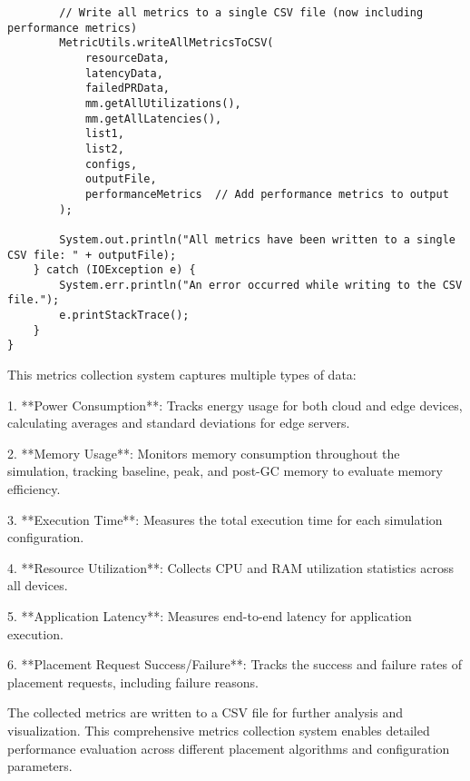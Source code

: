 \begin{verbatim}
        // Write all metrics to a single CSV file (now including performance metrics)
        MetricUtils.writeAllMetricsToCSV(
            resourceData, 
            latencyData, 
            failedPRData, 
            mm.getAllUtilizations(), 
            mm.getAllLatencies(), 
            list1, 
            list2, 
            configs, 
            outputFile,
            performanceMetrics  // Add performance metrics to output
        );
        
        System.out.println("All metrics have been written to a single CSV file: " + outputFile);
    } catch (IOException e) {
        System.err.println("An error occurred while writing to the CSV file.");
        e.printStackTrace();
    }
}
\end{verbatim}

This metrics collection system captures multiple types of data:

1. **Power Consumption**: Tracks energy usage for both cloud and edge devices, calculating averages and standard deviations for edge servers.

2. **Memory Usage**: Monitors memory consumption throughout the simulation, tracking baseline, peak, and post-GC memory to evaluate memory efficiency.

3. **Execution Time**: Measures the total execution time for each simulation configuration.

4. **Resource Utilization**: Collects CPU and RAM utilization statistics across all devices.

5. **Application Latency**: Measures end-to-end latency for application execution.

6. **Placement Request Success/Failure**: Tracks the success and failure rates of placement requests, including failure reasons.

The collected metrics are written to a CSV file for further analysis and visualization. This comprehensive metrics collection system enables detailed performance evaluation across different placement algorithms and configuration parameters. 